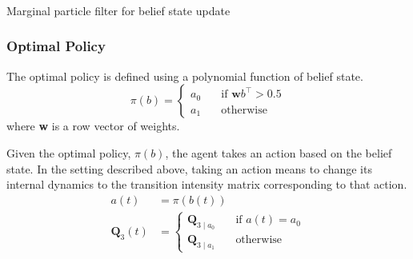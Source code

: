 \begin{algorithm}[H]
	
	\vspace{+4pt}
	\begin{algorithmic}[1]
		\\
		
		 \\
		\ENDFOR \\
		\\
		\\
		\ENDFOR 
	\end{algorithmic}
	\caption{Marginal particle filter for belief state update}
\end{algorithm}

\subsubsection{Optimal Policy}

The optimal policy is defined using a polynomial function of belief state.
\begin{equation}
\pi(b) = 
\begin{cases}
a_0 & \quad \text{if } \textbf{w}b^\intercal > 0.5 \\
a_1 & \quad \text{otherwise}
\end{cases}
\end{equation}
where \textbf{w} is a row vector of weights.

Given the optimal policy, $ \pi(b) $, the agent takes an action based on the belief state. In the setting described above, taking an action means to change its internal dynamics to the transition intensity matrix corresponding to that action.
\begin{align}
a(t) &= \pi(b(t))\\
\textbf{Q}_3(t) & = \begin{cases}
\textbf{Q}_{3\mid a_{0}} & \quad \text{if } a(t) = a_0 \\
\textbf{Q}_{3\mid a_{1}} & \quad \text{otherwise}
\end{cases}
\end{align}

